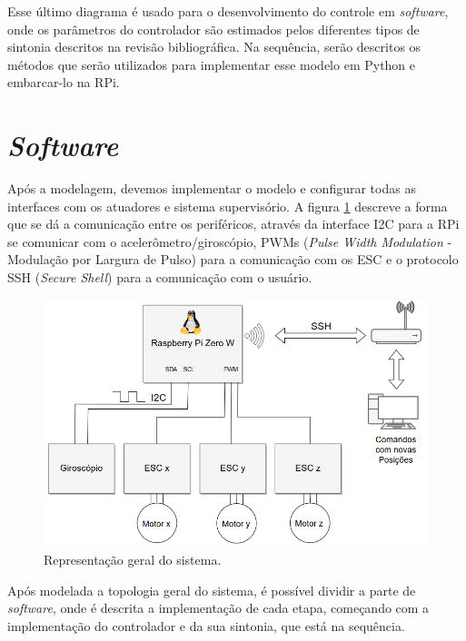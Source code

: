 Esse último diagrama é usado para o desenvolvimento do controle em \textit{software}, onde os parâmetros do controlador são estimados pelos diferentes tipos de sintonia descritos na revisão bibliográfica. Na sequência, serão descritos os métodos que serão utilizados para implementar esse modelo em Python e embarcar-lo na RPi.



\section{\textit{Software}}

Após a modelagem, devemos implementar o modelo e configurar todas as interfaces com os atuadores e sistema supervisório. A figura \ref{fig:comunicacao_projeto} descreve a forma que se dá a comunicação entre os periféricos, através da interface I2C para a RPi se comunicar com o acelerômetro/giroscópio, PWMs (\textit{Pulse Width Modulation} - Modulação por Largura de Pulso) para a comunicação com os ESC e o protocolo SSH (\textit{Secure Shell}) para a comunicação com o usuário.

\begin{figure}[H]
  \caption{Representação geral do sistema.}
  \begin{center}
      \includegraphics[scale=.55]{metodologia/img/comunicacao_projeto}
  \end{center}
  \label{fig:comunicacao_projeto}
\end{figure}


Após modelada a topologia geral do sistema, é possível dividir a parte de \textit{software}, onde é descrita a implementação de cada etapa, começando com a implementação do controlador e da sua sintonia, que está na sequência.


